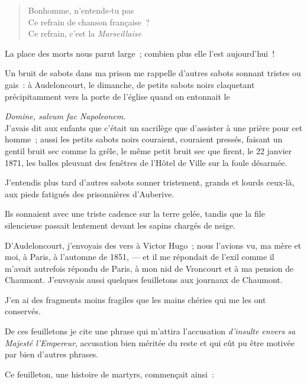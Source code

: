 \documentclass[french,twoside]{book} %
\newcommand{\astertri}{\medskip\par\centerline{\color{rubric}\large\selectfont{\syms ✻\,✻\,✻}}\medskip\par}%
\newenvironment{quoteblock}%
  {\begin{quoting}}
  {\end{quoting}}
\newenvironment{quotebar}{%
    \def\FrameCommand{{\color{rubric!10!}\vrule width 0.5em} \hspace{0.9em}}%
    \def\OuterFrameSep{\itemsep} %
    \MakeFramed {\advance\hsize-\width \FrameRestore}
  }%
  {%
    \endMakeFramed
  }
\renewenvironment{quoteblock}%
  {%
    \savenotes
    \setstretch{0.9}
    \normalfont
    \begin{quotebar}
  }
  {%
    \end{quotebar}
    \spewnotes
  }
\begin{document}
\begin{quoteblock}

\astertri

\end{quoteblock}

\begin{verse}
Bonhomme, n’entends-tu pas\\
Ce refrain de chanson française ?\\
Ce refrain, c’est la \emph{Marseillaise}\\
\end{verse}

\noindent La place des morts nous parut large ; combien plus elle l’est aujourd’hui !\par
Un bruit de sabots dans ma prison me rappelle d’autres sabots sonnant tristes ou gais : à Audeloncourt, le dimanche, de petits sabots noirs claquetant précipitamment vers la porte de l’église quand on entonnait le\par

\emph{Domine, salvum fac Napoleonem}.\\

 \noindent J’avais dit aux enfants que c’était un sacrilège que d’assister à une prière pour cet homme ; aussi les petits sabots noirs couraient, couraient pressés, faisant un gentil bruit sec comme la grêle, le même petit bruit sec que firent, le 22 janvier 1871, les balles pleuvant des fenêtres de l’Hôtel de Ville sur la foule désarmée.\par
J’entendis plus tard d’autres sabots sonner tristement, grands et lourds ceux-là, aux pieds fatigués des prisonnières d’Auberive.\par
Ils sonnaient avec une triste cadence sur la terre gelée, tandis que la file silencieuse passait lentement devant les sapins chargés de neige.\par
D’Audeloncourt, j’envoyais des vers à Victor Hugo ; nous l’avions vu, ma mère et moi, à Paris, à l’automne de 1851, — et il me répondait de l’exil comme il m’avait autrefois répondu de Paris, à mon nid de Vroncourt et à ma pension de Chaumont. J’envoyais aussi quelques feuilletons aux journaux de Chaumont.\par
J’en ai des fragments moins fragiles que les mains chéries qui me les ont conservés.\par
De ces feuilletons je cite une phrase qui m’attira l’accusation \emph{d’insulte envers sa Majesté l’Empereur}, accusation bien méritée du reste et qui eût pu être motivée par bien d’autres phrases.\par
 Ce feuilleton, une histoire de martyrs, commençait ainsi :\par
\end{document}
